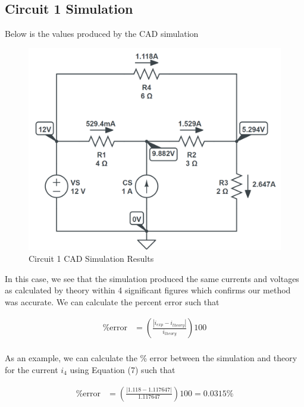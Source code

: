 \documentclass[12pt]{article}
\begin{document}
\subsection{Circuit 1 Simulation}
Below is the values produced by the CAD simulation
\begin{figure}[H]
    \begin{center}
        \includegraphics[scale=0.6]{circuit-1-sol.png}
        \caption { Circuit 1 CAD Simulation Results}
    \end{center}
\end{figure}

In this case, we see that the simulation produced the same currents and voltages as calculated by theory within 4 significant figures which confirms our method was accurate. We can calculate the percent error such that

\begin{equation}
    \begin{split}
        \text{\% error} &= \left( \frac{|i_{exp} - i_{theory}|}{i_{theory}} \right) 100 \\
    \end{split}
\end{equation}

As an example, we can calculate the \% error between the simulation and theory for the current $i_4$ using Equation (7) such that

\begin{equation*}
    \begin{split}
        \text{\% error} &= \left( \frac{|1.118 - 1.117647|}{1.117647} \right) 100 = 0.0315 \% \\
    \end{split}
\end{equation*}
\end{document}
